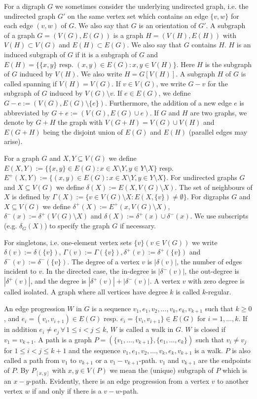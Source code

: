 For a digraph $G$ we sometimes consider the underlying undirected graph, i.e. the undirected graph $G'$ on the same 
vertex set which contains an edge $\{v, w\}$
for each edge $(v, w)$ of $G$. We also say that $G$ is an orientation of $G'$.
A subgraph of a graph $G = (V(G), E(G))$ is a graph $H = (V(H), E(H))$
with $V(H) \subset V(G)$ and $E(H) \subset E(G)$. We also say that $G$ contains $H$. $H$ is an
induced subgraph of $G$ if it is a subgraph of $G$ and $E (H) = \{ \{x, y\} \textrm{ resp. } (x, y) \in
E(G) : x, y \in V(H)\}$. Here $H$ is the subgraph of $G$ induced by $V(H)$. We also
write $H = G[V(H)]$. A subgraph $H$ of $G$ is called spanning if $V(H) = V(G)$.
If $v \in V(G)$, we write $G- v$ for the subgraph of $G$ induced by $V(G) \setminus {v}$.
If $e \in E(G)$, we define $G- e := (V(G), E(G) \setminus \{e\})$. Furthermore, the addition
of a new edge $e$ is abbreviated by $G + e := (V(G), E(G) \cup {e})$. If $G$ and $H$
are two graphs, we denote by $G + H$ the graph with $V(G +H)= V(G) \cup V(H)$
and $E(G +H)$ being the disjoint union of $E(G)$ and $E(H)$ (parallel edges may arise).

For a graph $G$ and $X, Y\subseteq V(G)$ we define $E(X, Y) := \{\{x, y\} \in E(G) : x \in
X \setminus Y, y \in Y \setminus X\}$ resp. $E^+(X, Y) := \{(x, y) \in E(G) : x \in X\setminus Y, y \in Y \setminus 
X\}$.
For undirected graphs $G$ and $X \subseteq V(G)$ we define $\delta(X) := E(X, V(G) \setminus X)$. The
set of neighbours of $X$ is defined by $ \Gamma(X) := \{v \in V(G) \setminus X : E(X, \{v\})  \neq \emptyset\}$.
For digraphs $G$ and $X \subseteq V(G)$ we define $\delta^+(X) := E^+(x, V(G) \setminus X)$, $\delta^-(x) :=
\delta^+(V(G) \setminus X)$ and $\delta(X) := \delta^+(x) \cup \delta^-(x)$. We use subscripts (e.g. $\delta_G(X)$) to
specify the graph $G$ if necessary.

For singletons, i.e. one-element vertex sets $\{v\} (v \in V(G))$ we write $\delta(v) :=
\delta(\{v\})$, $\Gamma(v) := \Gamma(\{v\}), \delta^+(v) := \delta^+(\{v\})$ and $\delta^-(v) := \delta^-(\{v\})$. The 
degree of a vertex $v$ is $|\delta(v)|$, the number of edges incident to $v$. In the directed case, the
in-degree is $|\delta^-(v)|$, the out-degree is $|\delta^+(v)|$, and the degree is $|\delta^+(v)|+ |\delta^-(v)|$.
A vertex $v$ with zero degree is called isolated. A graph where all vertices have
degree $k$ is called $k$-regular.

An edge progression $W$ in $G$ is a sequence $v_1, e_1, v_2, \dots , v_k, e_k, v_{k+1}$ such that $k \ge 0$,
and $e_i = (v_i, v_{i+ 1}) \in E(G)$ resp. $e_i = \{v_i, v_{i+1}\}\in E(G)$ for $i = 1, \dots , k$. If in
addition $e_i \ne e_j \,\forall\, 1 \le i < j \le k$, $W$ is called a walk in $G$. $W$ is closed if
$v_1 = v_{k+1}$. A path is a graph $P = (\{v_1, ... , v_{k+1}\}, \{e_1, ... , e_k\})$ such that $v_i \ne v_j$ for
$1 \le i < j \le k + 1$ and the sequence $v_1 , e_1 , v_2, \dots , v_k, e_k, v_{k+1}$ is a walk. $P$ is
also called a path from $v_1$ to $v_{k+1}$ or a $v_1 - v_{k+1}$-path. $v_1$ and $v_{k+1}$ are the endpoints
of $P$. By $P_{[x,y]}$ with $x, y \in V(P)$ we mean the (unique) subgraph of $P$ which is
an $x-y$-path. Evidently, there is an edge progression from a vertex $v$ to another
vertex $w$ if and only if there is a $v-w$-path.

